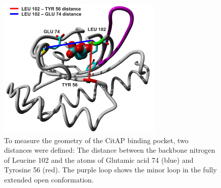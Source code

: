 \documentclass[english, a4paper, 12pt, titlepage, draft]{article}
\begin{document}
\begin{figure}
    \centering
    \includegraphics[width=0.7\textwidth]{figures/CitA_pocket2.pdf}
    \caption{To measure the geometry of the CitAP binding pocket, two distances were defined: The distance between the backbone nitrogen of Leucine 102 and the  atoms of Glutamic acid 74 (blue) and Tyrosine 56 (red).
    The purple loop shows the minor loop in the fully extended open conformation.}
    \label{fig:CitA_pocket}
\end{figure}        
\end{document}
